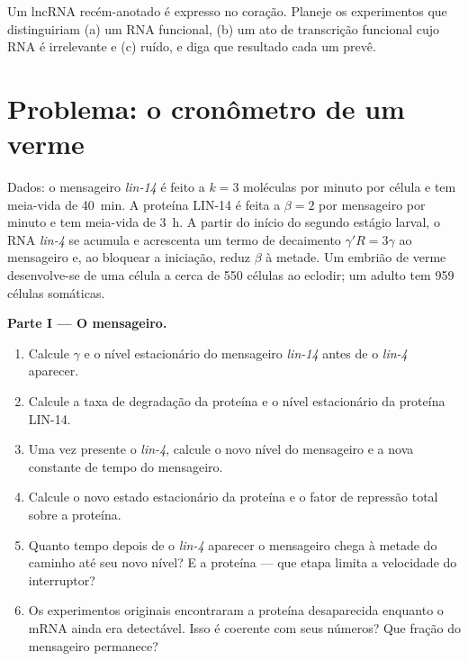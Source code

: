 \begin{exercise}[$\star\star\star$]\label{exo:b3:rna-regulation:12}
Um lncRNA recém-anotado é expresso no coração. Planeje os experimentos
que distinguiriam (a) um RNA funcional, (b) um ato de transcrição
funcional cujo RNA é irrelevante e (c) ruído, e diga que resultado
cada um prevê.
\end{exercise}

\section{Problema: o cronômetro de um verme}

\begin{problem}
\label{pb:b3:rna-regulation:1}
Dados: o mensageiro \emph{lin-14} é feito a $k = 3$ moléculas por
minuto por célula e tem meia-vida de \qty{40}{min}. A proteína LIN-14 é
feita a $\beta = 2$ por mensageiro por minuto e tem meia-vida de
\qty{3}{h}. A partir do início do segundo estágio larval, o RNA
\emph{lin-4} se acumula e acrescenta um termo de decaimento
$\gamma' R = 3\gamma$ ao mensageiro e, ao bloquear a iniciação,
reduz $\beta$ à metade. Um embrião de verme desenvolve-se de uma
célula a cerca de \num{550} células ao eclodir; um adulto tem
\num{959} células somáticas.

\medskip
\noindent\textbf{Parte I --- O mensageiro.}
\begin{enumerate}
  \item Calcule $\gamma$ e o nível estacionário do mensageiro
        \emph{lin-14} antes de o \emph{lin-4} aparecer.
  \item Calcule a taxa de degradação da proteína e o nível
        estacionário da proteína LIN-14.
  \item Uma vez presente o \emph{lin-4}, calcule o novo nível do
        mensageiro e a nova constante de tempo do mensageiro.
  \item Calcule o novo estado estacionário da proteína e o fator de
        repressão total sobre a proteína.
  \item Quanto tempo depois de o \emph{lin-4} aparecer o mensageiro
        chega à metade do caminho até seu novo nível? E a proteína ---
        que etapa limita a velocidade do interruptor?
  \item Os experimentos originais encontraram a proteína desaparecida
        enquanto o mRNA ainda era detectável. Isso é coerente com seus
        números? Que fração do mensageiro permanece?
\end{enumerate}


\end{problem}
